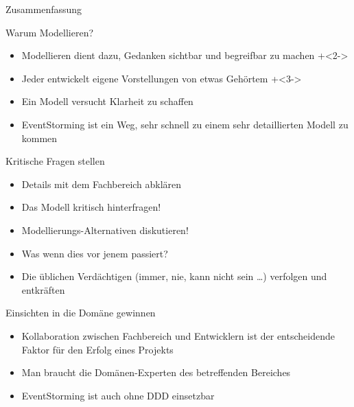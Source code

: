 \begin{frame}[fragile]{}

\begin{center}
{
\LARGE
Zusammenfassung
}
\end{center}

\end{frame}

\begin{frame}[fragile]{Warum Modellieren?}

\begin{itemize}
\item Modellieren dient dazu, Gedanken sichtbar und \glqq begreifbar\grqq{} zu machen
\onslide+<2->
\item Jeder entwickelt eigene Vorstellungen von etwas Gehörtem
\onslide+<3->
\item Ein Modell versucht Klarheit zu schaffen
\item EventStorming ist ein Weg, sehr schnell zu einem sehr detaillierten Modell zu kommen
\end{itemize}

\end{frame}

\begin{frame}[fragile]{Kritische Fragen stellen}

\begin{itemize}
\item Details mit dem Fachbereich abklären
\item Das Modell kritisch hinterfragen!
\item Modellierungs-Alternativen diskutieren!
\item \glqq Was wenn dies vor jenem passiert?\grqq
\item Die üblichen Verdächtigen (\glqq immer\grqq, \glqq nie\grqq, \glqq kann nicht sein\grqq{} \ldots) verfolgen und entkräften
\end{itemize}

\end{frame}

\begin{frame}[fragile]{Einsichten in die Domäne gewinnen}
\begin{itemize}
\item Kollaboration zwischen Fachbereich und Entwicklern ist der entscheidende Faktor für den Erfolg eines Projekts
\item Man braucht die Domänen-Experten des betreffenden Bereiches
\item EventStorming ist auch ohne DDD einsetzbar
\end{itemize}

\end{frame}

